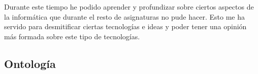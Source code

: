 \documentclass[12pt]{report} %
\begin{document}
Durante este tiempo he podido aprender y profundizar sobre ciertos aspectos de la informática que durante el resto de asignaturas no pude hacer. Esto me ha servido para desmitificar ciertas tecnologías e ideas y poder tener una opinión más formada sobre este tipo de tecnologías.


\begin{appendices}
\chapter{Ontología}

\end{appendices}



\end{document}
